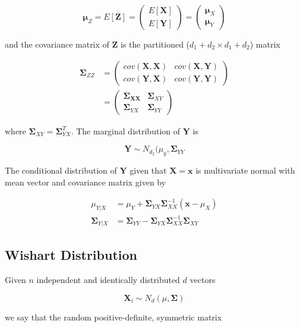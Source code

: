 \documentclass[11pt]{article}
\theoremstyle{definition}
\begin{document}
$$\mathbf{\mu}_Z = E[\mathbf{Z}] = \begin{pmatrix} E[\mathbf{X}] \\ E[\mathbf{Y}] \end{pmatrix} = \begin{pmatrix} \mathbf{\mu}_X \\ \mathbf{\mu}_Y \end{pmatrix}$$

and the covariance matrix of $\mathbf{Z}$ is the partitioned ($d_1 + d_2 \times d_1 + d_2$) matrix

\begin{align*}
\mathbf{\Sigma}_{ZZ} &= \begin{pmatrix} cov(\mathbf{X}, \mathbf{X}) & cov(\mathbf{X}, \mathbf{Y}) \\ cov(\mathbf{Y}, \mathbf{X}) & cov(\mathbf{Y}, \mathbf{Y})  \end{pmatrix}\\
&= \begin{pmatrix}
\mathbf{\Sigma_{XX}} & \mathbf{\Sigma}_{XY}\\
\mathbf{\Sigma}_{YX} & \mathbf{\Sigma}_{YY}
\end{pmatrix}
\end{align*}

where $\mathbf{\Sigma}_{XY} = \mathbf{\Sigma}_{YX}^T$.  The marginal distribution of $\mathbf{Y}$ is

$$\mathbf{Y} \sim N_{d_2}(\mu_y, \mathbf{\Sigma}_{YY}$$

The conditional distribution of $\mathbf{Y}$ given that $\mathbf{X} = \mathbf{x}$ is multivariate normal with mean vector and covariance matrix given by

\begin{align*}
\mu_{Y|X} &= \mu_Y + \mathbf{\Sigma}_{YX} \mathbf{\Sigma}_{XX}^{-1} (\mathbf{x} - \mu_X)\\
\mathbf{\Sigma}_{Y|X} &= \mathbf{\Sigma}_{YY} - \mathbf{\Sigma}_{YX}\mathbf{\Sigma}_{XX}^{-1}\mathbf{\Sigma}_{XY}
\end{align*}

\subsection{Wishart Distribution}
Given $n$ independent and identically distributed $d$ vectors

$$\mathbf{X}_i \sim N_d(\mu , \mathbf{\Sigma})$$

we say that the random positive-definite, symmetric matrix
\end{document}
